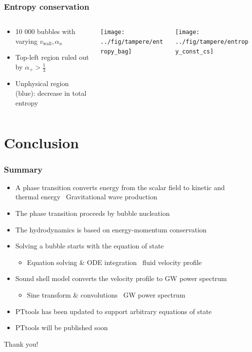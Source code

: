 \begin{frame}
    \frametitle{Entropy conservation}
    \begin{columns}
    \begin{column}{0.3\textwidth}
        \begin{itemize}
            \item 10 000 bubbles with varying $v_\text{wall}, \alpha_n$
            \item Top-left region ruled out by $\alpha_+ > \frac{1}{3}$
            \item Unphysical region (blue): decrease in total entropy
        \end{itemize}%
    \end{column}
    \begin{column}{0.35\textwidth}
        \texttt{[image: ../fig/tampere/entropy\_bag]}
    \end{column}
    \begin{column}{0.35\textwidth}
        \texttt{[image: ../fig/tampere/entropy\_const\_cs]}
    \end{column}
    \end{columns}
\end{frame}

\section{Conclusion}

\begin{frame}
    \frametitle{Summary}
    \begin{itemize}
        \item A phase transition converts energy from the scalar field to kinetic and thermal energy
            \textrightarrow \ Gravitational wave production
        \item The phase transition proceeds by bubble nucleation
        \item The hydrodynamics is based on energy-momentum conservation
        \item Solving a bubble starts with the equation of state
        \begin{itemize}
            \item Equation solving \& ODE integration \textrightarrow \ fluid velocity profile
        \end{itemize}
        \item Sound shell model converts the velocity profile to GW power spectrum
        \begin{itemize}
            \item Sine transform \& convolutions \textrightarrow \ GW power spectrum
        \end{itemize}
        \item PTtools has been updated to support arbitrary equations of state
        \item PTtools will be published soon
    \end{itemize}
    Thank you!
\end{frame}

